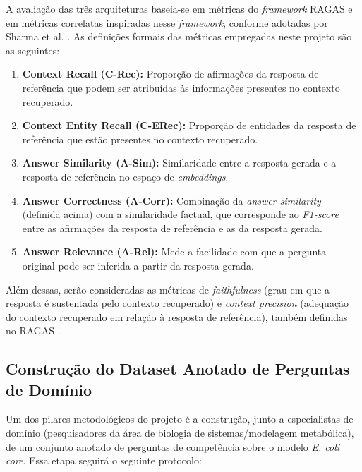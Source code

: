 \documentclass{article}
\begin{document}
	A avaliação das três arquiteturas baseia-se em métricas do \textit{framework} RAGAS \cite{es-etal-2024-ragas} e em métricas correlatas inspiradas nesse \textit{framework}, conforme adotadas por Sharma et al. \cite{sharma2025ograg}. As definições formais das métricas empregadas neste projeto são as seguintes: %
	
	\begin{enumerate} %
		\item \textbf{Context Recall (C-Rec):} Proporção de afirmações da resposta de referência que podem ser atribuídas às informações presentes no contexto recuperado.
		\item \textbf{Context Entity Recall (C-ERec):} Proporção de entidades da resposta de referência que estão presentes no contexto recuperado.
		\item \textbf{Answer Similarity (A-Sim):} Similaridade entre a resposta gerada e a resposta de referência no espaço de \textit{embeddings}.
		\item \textbf{Answer Correctness (A-Corr):} Combinação da \textit{answer similarity} (definida acima) com a similaridade factual, que corresponde ao \textit{F1-score} entre as afirmações da resposta de referência e as da resposta gerada.
		\item \textbf{Answer Relevance (A-Rel):} Mede a facilidade com que a pergunta original pode ser inferida a partir da resposta gerada.
	\end{enumerate}
	
	Além dessas, serão consideradas as métricas de \textit{faithfulness} (grau em que a resposta é sustentada pelo contexto recuperado) e \textit{context precision} (adequação do contexto recuperado em relação à resposta de referência), também definidas no RAGAS \cite{es-etal-2024-ragas}. %
	
	\subsection{Construção do Dataset Anotado de Perguntas de Domínio}
	
	Um dos pilares metodológicos do projeto é a construção, junto a especialistas de domínio (pesquisadores da área de biologia de sistemas/modelagem metabólica), de um conjunto anotado de perguntas de competência sobre o modelo \textit{E. coli core}. Essa etapa seguirá o seguinte protocolo:
	
\end{document}
